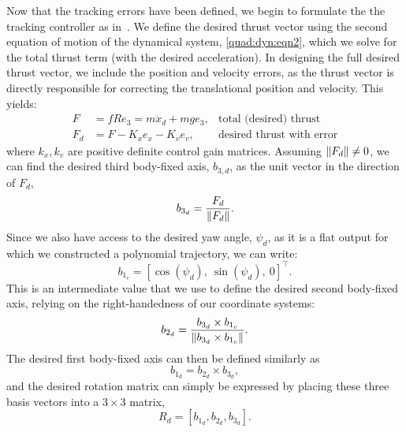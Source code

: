 Now that the tracking errors have been defined, we begin to formulate the the tracking controller as in~\cite{Lee2010,Mellinger2012}. We define the desired thrust vector using the second equation of motion of the dynamical system, \autoref{quad:dyn:eqn2}, which we solve for the total thrust term (with the desired acceleration). In designing the full desired thrust vector, we include the position and velocity errors, as the thrust vector is directly responsible for correcting the translational position and velocity. This yields:
\begin{align}
    F &= fRe_3 = m\ddot{x}_d + mge_3, &\text{total (desired) thrust} \\
    F_d &= F - K_x e_x - K_v e_v, &\text{desired thrust with error}
\end{align}
where $k_x, k_v$ are positive definite control gain matrices. Assuming $\left\lVert F_d\right\rVert \neq 0$, we can find the desired third body-fixed axis, $b_{3,d}$, as the unit vector in the direction of $F_d$,
\begin{equation}
    b_{3_d} = \frac{F_d}{\left\lVert F_d\right\rVert}.
\end{equation}
Since we also have access to the desired yaw angle, $\psi_d$, as it is a flat output for which we constructed a polynomial trajectory, we can write:
\begin{equation}
    b_{1_c} = {[\cos(\psi_d),\ \sin(\psi_d),\ 0]}^\top. 
\end{equation}
This is an intermediate value that we use to define the desired second body-fixed axis, relying on the right-handedness of our coordinate systems:
\begin{equation}
    b_{2_d} = \frac{b_{3_d} \times b_{1_c}}{\left\lVert b_{3_d} \times b_{1_c}\right\rVert}.
\end{equation}
The desired first body-fixed axis can then be defined similarly as
\begin{equation}
    b_{1_d} = b_{2_d} \times b_{3_d},
\end{equation}
and the desired rotation matrix can simply be expressed by placing these three basis vectors into a $3 \times 3$ matrix,
\begin{equation}
    R_d = [b_{1_d}, b_{2_d}, b_{3_d}].
\end{equation}

